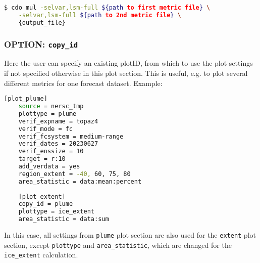 \documentclass[DIV=10, parskip=full]{scrreprt}
\begin{document}
\begin{lstlisting}[language=bash]
	$ cdo mul -selvar,lsm-full ${path to first metric file} \
	-selvar,lsm-full ${path to 2nd metric file} \
	{output_file}
\end{lstlisting}

\subsubsection{OPTION: \texttt{copy\_id}}
Here the user can specify an existing plotID, from which to use the plot settings if not specified otherwise in this plot section. This is useful, e.g. to plot several different metrics for one forecast dataset. Example:

\begin{lstlisting}[language=bash]
	[plot_plume]
	source = nersc_tmp   
	plottype = plume 
	verif_expname = topaz4 
	verif_mode = fc
	verif_fcsystem = medium-range
	verif_dates = 20230627
	verif_enssize = 10
	target = r:10
	add_verdata = yes
	region_extent = -40, 60, 75, 80
	area_statistic = data:mean:percent
	
	[plot_extent]
	copy_id = plume
	plottype = ice_extent 
	area_statistic = data:sum
\end{lstlisting}

In this case, all settings from \texttt{plume} plot section are also used for the \texttt{extent} plot section, except \texttt{plottype} and \texttt{area\_statistic}, which are changed for the \texttt{ice\_extent} calculation. 
\end{document}
